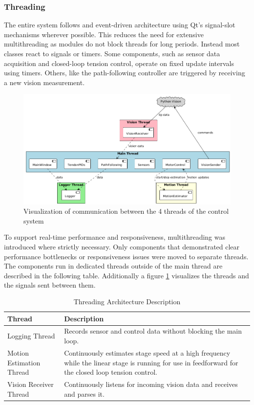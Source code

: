 \subsubsection{Threading}
The entire system follows and event-driven architecture using Qt's signal-slot mechanisms wherever possible. This reduces the need for extensive multithreading as modules do not block threads for long periods. Instead most classes react to signals or timers. Some components, such as sensor data acquisition and closed-loop tension control, operate on fixed update intervals using timers. Others, like the path-following controller are triggered by receiving a new vision measurement.
\begin{figure} [H]
    \centering
    \includegraphics[width=0.95\linewidth]{images/Software documentation/threads.png}
    \caption{Visualization of communication between the 4 threads of the control system}
    \label{fig:threads}
\end{figure}
To support real-time performance and responsiveness, multithreading was introduced where strictly necessary. Only components that demonstrated clear performance bottlenecks or responsiveness issues were moved to separate threads. The components run in dedicated threads outside of the main thread are described in the following table. Additionally a figure \ref{fig:threads} visualizes the threads and the signals sent between them. 

\begin{table}[htbp]
\centering
\caption{Threading Architecture Description}
\begin{tabular}{p{}p{}}
\toprule
\textbf{Thread} & \textbf{Description} \\
\midrule
Logging Thread & Records sensor and control data without blocking the main loop. \\
\addlinespace
Motion Estimation Thread & Continuously estimates stage speed at a high frequency while the linear stage is running for use in feedforward for the closed loop tension control. \\
\addlinespace
Vision Receiver Thread & Continuously listens for incoming vision data and receives and parses it. \\
\bottomrule
\end{tabular}
\end{table}

